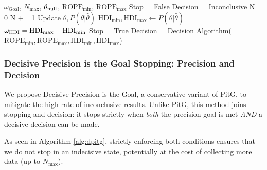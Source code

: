 \begin{algorithm}
    \caption{Precision is the Goal (highlighted: the stopping condition)}\label{alg:pitg}
    \begin{algorithmic}
    \Require $\omega_\mathrm{Goal}$, $N_\mathrm{max}$, $\theta_{\rm null}$, $\mathrm{ROPE}_\mathrm{min}$, $\mathrm{ROPE}_\mathrm{max}$
    \State Stop = False
    \State Decision = Inconclusive
    \State N = 0
    \State N += 1 
    \State Update $\hat\theta, P(\theta|\hat\theta)$ 
    \State $\mathrm{HDI}_\mathrm{min}, \mathrm{HDI}_\mathrm{max} \gets P(\theta|\hat\theta)$
    \State $\omega_{\rm HDI} = \mathrm{HDI}_\mathrm{max} - \mathrm{HDI}_\mathrm{min}$
         \State \HiLi Stop = True 
         \State Decision = Decision Algorithm($\mathrm{ROPE}_\mathrm{min}, \mathrm{ROPE}_\mathrm{max}, \mathrm{HDI}_\mathrm{min}, \mathrm{HDI}_\mathrm{max}$)  
    \EndIf
    \EndWhile
    \end{algorithmic}
\end{algorithm}

\subsubsection{Decisive Precision is the Goal Stopping: Precision and Decision}\label{sec:decisive_pitg}

We propose Decisive Precision is the Goal, a conservative variant of PitG,
to mitigate the high rate of inconclusive results. Unlike PitG, this method joins stopping
and decision: it stops strictly when \textit{both} the precision goal is met \textit{AND}
a decisive decision can be made.


As seen in Algorithm \ref{alg:dpitg}, strictly enforcing both conditions ensures that we do not stop in an indecisive state, potentially at the cost of collecting more data (up to $N_\mathrm{max}$).

